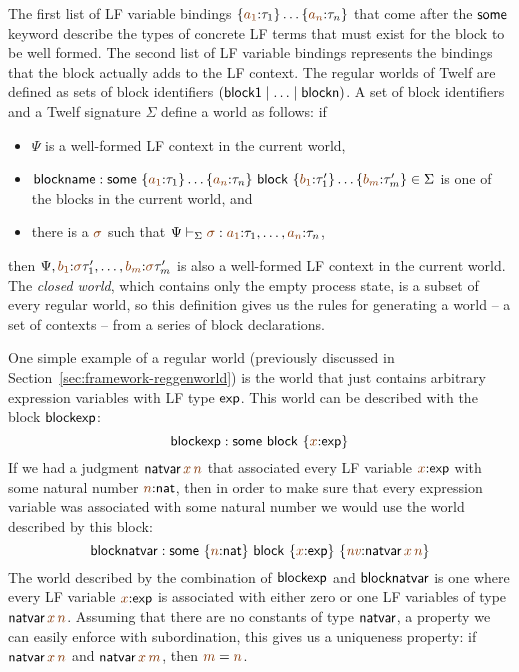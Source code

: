 The first list of LF variable bindings
$\{\lf{a_1}{:}\tau_1\}\ldots\{\lf{a_n}{:}\tau_n\}$ that 
come after the ${\sf some}$ keyword describe the types
of concrete LF terms that must exist for the block to be well formed.
The second list of LF variable bindings represents the bindings that
the block actually adds to the LF context. The regular worlds of 
Twelf are defined as sets of block identifiers 
$({\sf block1} \mid \ldots \mid {\sf blockn})$. A set of block identifiers
and a Twelf signature $\Sigma$ define a world as follows: if
\smallskip
\begin{itemize}
\item $\Psi$ is a well-formed
LF context in the current world, 
\item ${\sf blockname} :
 {\sf some}~\{\lf{a_1}{:}\tau_1\}\ldots\{\lf{a_n}{:}\tau_n\}
~{\sf block}~\{\lf{b_1}{:}\tau'_1\}\ldots\{\lf{b_m}{:}\tau'_m\} \in \Sigma$
 is one of the blocks in the current world, and
\item there is a $\lf{\sigma}$ such that
$\Psi \vdash_\Sigma \lf{\sigma} :
\lf{a_1}{:}\tau_1,\ldots,\lf{a_n}{:}\tau_n$, 
\end{itemize}
\smallskip then $\Psi, \lf{b_1}{:}\lf\sigma\tau'_1,\ldots,
\lf{b_m}{:}\lf\sigma\tau'_m$ is also a well-formed LF context in the
current world. The {\it closed world}, which contains only the empty
process state, is a subset of every regular world, so this definition
gives us the rules for generating a world -- a set of contexts -- from
a series of block declarations.

One simple example of a regular world (previously discussed in
Section~\ref{sec:framework-reggenworld}) is the world that just
contains arbitrary expression variables with LF type ${\sf exp}$. This
world can be described with the block ${\sf blockexp}$:
\[
 {\sf blockexp} : 
 {\sf some}
~{\sf block}~\{{\lf x}{:}{\sf exp}\}
\]
If we had a judgment ${\sf natvar}\,\lf{x}\,\lf{n}$ that associated
every LF variable $\lf{x}{:}{\sf exp}$ with some natural number
$\lf{n}{:}{\sf nat}$, then in order to make sure that every expression
variable was associated with some natural number we would use the world
described by this block:
\[
 {\sf blocknatvar} : 
 {\sf some}~\{{\lf n}{:}{\sf nat}\}
~{\sf block}~\{{\lf x}{:}{\sf exp}\}~
               \{\lf{\it nv}{:}{\sf natvar}\,\lf{x}\,\lf{n}\}
\]
The world described by the combination of ${\sf blockexp}$ and ${\sf
  blocknatvar}$ is one where every LF variable $\lf{x}{:}{\sf exp}$
is associated with either zero or one LF variables of type ${\sf
  natvar}\,\lf{x}\,\lf{n}$. Assuming that there are no constants of
type ${\sf natvar}$, a property we can easily enforce with subordination, this
gives us a uniqueness property: if ${\sf natvar}\,\lf{x}\,\lf{n}$ and
${\sf natvar}\,\lf{x}\,\lf{m}$, then $\lf{m} = \lf{n}$. 

